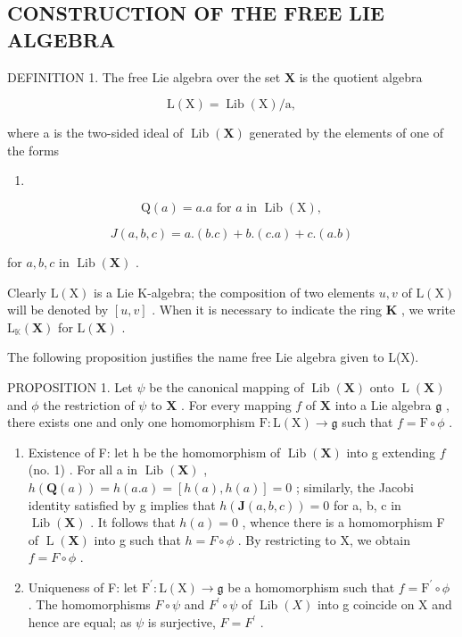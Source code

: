 \subsection{CONSTRUCTION OF THE FREE LIE ALGEBRA}

DEFINITION 1. The free Lie algebra over the set \(\mathbf{X}\) is the quotient algebra

\[
\mathrm{L} (\mathrm{X}) = \operatorname{Lib} (\mathrm{X}) / \mathrm{a},
\]

where a is the two-sided ideal of \(\operatorname{Lib}(\mathbf{X})\) generated by the elements of one of the forms

\begin{enumerate}
\def\labelenumi{(\arabic{enumi})}
\tightlist
\item
\end{enumerate}

\[
\mathrm{Q} (a) = a. a \text {   for   } a \text {   in   } \operatorname{Lib} (\mathrm{X}),\tag{2}
\]

\[
J (a, b, c) = a. (b. c) + b. (c. a) + c. (a. b)
\]

for \(a, b, c\) in \(\operatorname{Lib}(\mathbf{X})\) .

Clearly \(\mathrm{L}(\mathrm{X})\) is a Lie K-algebra; the composition of two elements \(u, v\) of \(\mathrm{L}(\mathrm{X})\) will be denoted by \([u, v]\) . When it is necessary to indicate the ring \(\mathbf{K}\) , we write \(\mathrm{L}_{\mathbb{K}}(\mathbf{X})\) for \(\mathrm{L}(\mathbf{X})\) .

The following proposition justifies the name free Lie algebra given to L(X).

PROPOSITION 1. Let \(\psi\) be the canonical mapping of \(\operatorname{Lib}(\mathbf{X})\) onto \(\operatorname{L}(\mathbf{X})\) and \(\phi\) the restriction of \(\psi\) to \(\mathbf{X}\) . For every mapping \(f\) of \(\mathbf{X}\) into a Lie algebra \(\mathfrak{g}\) , there exists one and only one homomorphism \(\mathrm{F}:\mathrm{L}(\mathrm{X})\to \mathfrak{g}\) such that \(f = \mathrm{F}\circ \phi\) .

\begin{enumerate}
\def\labelenumi{(\alph{enumi})}
\item
  Existence of F: let h be the homomorphism of \(\operatorname{Lib}(\mathbf{X})\) into g extending \(f\) (no. 1) . For all a in \(\operatorname{Lib}(\mathbf{X})\) , \(h(\mathbf{Q}(a)) = h(a.a) = [h(a), h(a)] = 0\) ; similarly, the Jacobi identity satisfied by g implies that \(h(\mathbf{J}(a, b, c)) = 0\) for a, b, c in \(\operatorname{Lib}(\mathbf{X})\) . It follows that \(h(a) = 0\) , whence there is a homomorphism F of \(\operatorname{L}(\mathbf{X})\) into g such that \(h = F \circ \phi\) . By restricting to X, we obtain \(f = F \circ \phi\) .
\item
  Uniqueness of F: let \(\mathrm{F}^{\prime}:\mathrm{L}(\mathrm{X})\to\mathfrak{g}\) be a homomorphism such that \(f=\mathrm{F}^{\prime}\circ\phi\) . The homomorphisms \(F\circ\psi\) and \(F^{\prime}\circ\psi\) of \(\operatorname{Lib}(X)\) into g coincide on X and hence are equal; as \(\psi\) is surjective, \(F=F^{\prime}\) .
\end{enumerate}

